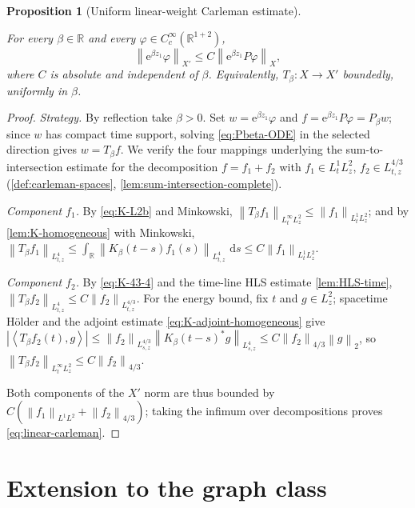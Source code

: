\documentclass[11pt,oneside]{book}
\providecommand{\uses}[1]{}
\newtheorem{proposition}[theorem]{Proposition}
\theoremstyle{definition}
\theoremstyle{remark}
\newcommand{\R}{\mathbb R}
\newcommand{\1}{\mathbf 1}
\newcommand{\dd}{\,\mathrm d}
\newcommand{\norm}[1]{\left\lVert #1\right\rVert}
\newcommand{\pair}[2]{\left\langle #1,#2\right\rangle}
\newcommand{\e}{\mathrm e}
\begin{document}
\begin{proposition}[Uniform linear-weight Carleman estimate]\label{prop:linear-carleman}
\uses{def:conjugated-operator, def:carleman-spaces}
For every $\beta\in\R$ and every $\varphi\in C_c^\infty(\R^{1+2})$,
\begin{equation}
 \norm{\e^{\beta z_1}\varphi}_{X'}\le C\norm{\e^{\beta z_1}P\varphi}_{X}, \label{eq:linear-carleman}
\end{equation}
where $C$ is absolute and independent of $\beta$. Equivalently, $T_\beta:X\to X'$ boundedly,
uniformly in $\beta$.
\end{proposition}

\begin{proof}
\uses{lem:Tbeta-kernel, lem:K-homogeneous, lem:HLS-time, def:Tbeta, lem:sum-intersection-complete}
\emph{Strategy.} By reflection take $\beta>0$. Set $w=\e^{\beta z_1}\varphi$ and
$f=\e^{\beta z_1}P\varphi=P_\beta w$; since $w$ has compact time support, solving
\eqref{eq:Pbeta-ODE} in the selected direction gives $w=T_\beta f$. We verify the four
mappings underlying the sum-to-intersection estimate for the decomposition $f=f_1+f_2$ with
$f_1\in L^1_tL^2_z$, $f_2\in L^{4/3}_{t,z}$ (\cref{def:carleman-spaces},
\cref{lem:sum-intersection-complete}).

\emph{Component $f_1$.} By \eqref{eq:K-L2b} and Minkowski,
$\norm{T_\beta f_1}_{L^\infty_tL^2_z}\le\norm{f_1}_{L^1_tL^2_z}$; and by
\cref{lem:K-homogeneous} with Minkowski,
$\norm{T_\beta f_1}_{L^4_{t,z}}\le\int_\R\norm{K_\beta(t-s)f_1(s)}_{L^4_{t,z}}\,\dd s
 \le C\norm{f_1}_{L^1_tL^2_z}$.

\emph{Component $f_2$.} By \eqref{eq:K-43-4} and the time-line HLS estimate
\cref{lem:HLS-time}, $\norm{T_\beta f_2}_{L^4_{t,z}}\le C\norm{f_2}_{L^{4/3}_{t,z}}$. For the
energy bound, fix $t$ and $g\in L^2_z$; spacetime H\"older and the adjoint estimate
\eqref{eq:K-adjoint-homogeneous} give
$|\pair{T_\beta f_2(t)}{g}|\le\norm{f_2}_{L^{4/3}_{s,z}}\norm{K_\beta(t-s)^*g}_{L^4_{s,z}}
 \le C\norm{f_2}_{4/3}\norm g_2$, so $\norm{T_\beta f_2}_{L^\infty_tL^2_z}\le C\norm{f_2}_{4/3}$.

Both components of the $X'$ norm are thus bounded by
$C(\norm{f_1}_{L^1L^2}+\norm{f_2}_{4/3})$; taking the infimum over decompositions proves
\eqref{eq:linear-carleman}.
\end{proof}

\section{Extension to the graph class}
\end{document}
